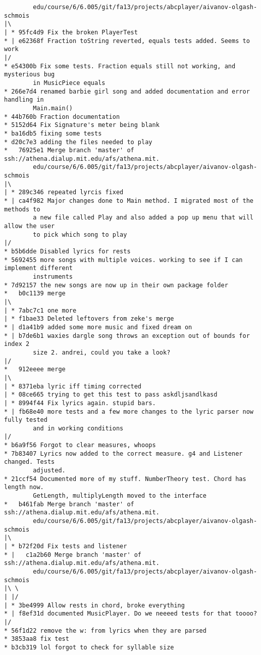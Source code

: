 \documentclass[12pt]{book}
\begin{document}
\begin{Verbatim}
        edu/course/6/6.005/git/fa13/projects/abcplayer/aivanov-olgash-schmois
|\
| * 95fc4d9 Fix the broken PlayerTest
* | e62368f Fraction toString reverted, equals tests added. Seems to work
|/
* e54300b Fix some tests. Fraction equals still not working, and mysterious bug 
        in MusicPiece equals
* 266e7d4 renamed barbie girl song and added documentation and error handling in 
        Main.main()
* 44b760b Fraction documentation
* 5152d64 Fix Signature's meter being blank
* ba16db5 fixing some tests
* d20c7e3 adding the files needed to play
*   76925e1 Merge branch 'master' of ssh://athena.dialup.mit.edu/afs/athena.mit.
        edu/course/6/6.005/git/fa13/projects/abcplayer/aivanov-olgash-schmois
|\
| * 289c346 repeated lyrcis fixed
* | ca4f982 Major changes done to Main method. I migrated most of the methods to 
        a new file called Play and also added a pop up menu that will allow the user 
        to pick which song to play
|/
* b5b6dde Disabled lyrics for rests
* 5692455 more songs with multiple voices. working to see if I can implement different 
        instruments
* 7d92157 the new songs are now up in their own package folder
*   b0c1139 merge
|\
| * 7abc7c1 one more
| * f1bae33 Deleted leftovers from zeke's merge
* | d1a41b9 added some more music and fixed dream on
* | b7de6b1 waxies dargle song throws an exception out of bounds for index 2 
        size 2. andrei, could you take a look?
|/
*   912eeee merge
|\
| * 8371eba lyric iff timing corrected
| * 08ce665 trying to get this test to pass askdljsandlkasd
| * 8994f44 Fix lyrics again. stupid bars.
* | fb68e40 more tests and a few more changes to the lyric parser now fully tested 
        and in working conditions
|/
* b6a9f56 Forgot to clear measures, whoops
* 7b83407 Lyrics now added to the correct measure. g4 and Listener changed. Tests 
        adjusted.
* 21ccf54 Documented more of my stuff. NumberTheory test. Chord has length now. 
        GetLength, multiplyLength moved to the interface
*   b461fab Merge branch 'master' of ssh://athena.dialup.mit.edu/afs/athena.mit.
        edu/course/6/6.005/git/fa13/projects/abcplayer/aivanov-olgash-schmois
|\
| * b72f20d Fix tests and listener
* |   c1a2b60 Merge branch 'master' of ssh://athena.dialup.mit.edu/afs/athena.mit.
        edu/course/6/6.005/git/fa13/projects/abcplayer/aivanov-olgash-schmois
|\ \
| |/
| * 3be4999 Allow rests in chord, broke everything
* | f8ef31d documented MusicPlayer. Do we neeeed tests for that toooo?
|/
* 56f1d22 remove the w: from lyrics when they are parsed
* 3853aa8 fix test
* b3cb319 lol forgot to check for syllable size

\end{Verbatim}
\end{document}
